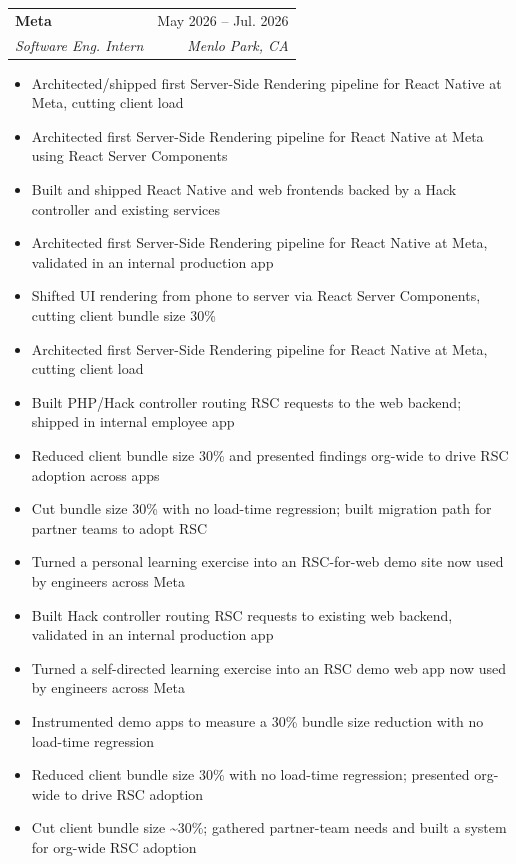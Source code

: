 \documentclass[letterpaper,11pt]{article}
\makeatletter
\newcommand{\resumeItem}[1]{
  \item\small{
    {#1 \vspace{-2pt}}
  }
}
\newcommand{\resumeSubheading}[4]{
  \vspace{-2pt}\item
    \begin{tabular*}{0.97\textwidth}[t]{l@{\extracolsep{\fill}}r}
      \textbf{#1} & #2 \\
      \textit{\small#3} & \textit{\small #4} \\
    \end{tabular*}\vspace{-7pt}
}
\newcommand{\resumeItemListStart}{\begin{itemize}}
\newcommand{\resumeItemListEnd}{\end{itemize}\vspace{-5pt}}
\makeatother
\begin{document}
    \resumeSubheading
      {Meta}{May 2026 -- Jul. 2026}
      {Software Eng. Intern}{Menlo Park, CA}
      \resumeItemListStart
        \resumeItem{Architected/shipped first Server-Side Rendering pipeline for React Native at Meta, cutting client load}
        \resumeItem{Architected first Server-Side Rendering pipeline for React Native at Meta using React Server Components}
        \resumeItem{Built and shipped React Native and web frontends backed by a Hack controller and existing services}
        \resumeItem{Architected first Server-Side Rendering pipeline for React Native at Meta, validated in an internal production app}
        \resumeItem{Shifted UI rendering from phone to server via React Server Components, cutting client bundle size 30\%}
        \resumeItem{Architected first Server-Side Rendering pipeline for React Native at Meta, cutting client load}
        \resumeItem{Built PHP/Hack controller routing RSC requests to the web backend; shipped in internal employee app}
        \resumeItem{Reduced client bundle size 30\% and presented findings org-wide to drive RSC adoption across apps}
        \resumeItem{Cut bundle size 30\% with no load-time regression; built migration path for partner teams to adopt RSC}
        \resumeItem{Turned a personal learning exercise into an RSC-for-web demo site now used by engineers across Meta}
        \resumeItem{Built Hack controller routing RSC requests to existing web backend, validated in an internal production app}
        \resumeItem{Turned a self-directed learning exercise into an RSC demo web app now used by engineers across Meta}
        \resumeItem{Instrumented demo apps to measure a 30\% bundle size reduction with no load-time regression}
        \resumeItem{Reduced client bundle size 30\% with no load-time regression; presented org-wide to drive RSC adoption}
        \resumeItem{Cut client bundle size \textasciitilde30\%; gathered partner-team needs and built a system for org-wide RSC adoption}
      \resumeItemListEnd
      
\end{document}
